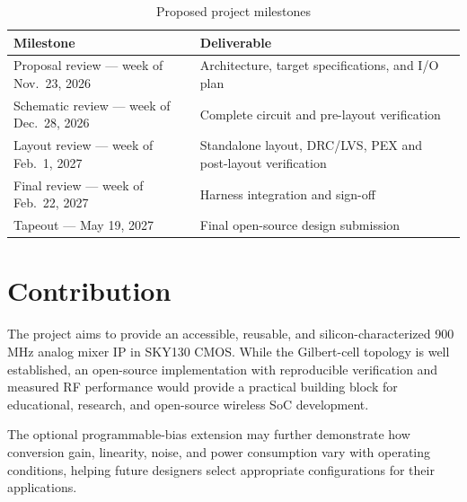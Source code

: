 \documentclass[11pt,letterpaper]{article}
\begin{document}
\begin{table}[htbp]
\centering
\caption{Proposed project milestones}
\label{tab:milestones}
\begin{tabularx}{\textwidth}{@{}p{}Y@{}}
\toprule
\textbf{Milestone} & \textbf{Deliverable} \\
\midrule

Proposal review --- week of Nov.\ 23, 2026 &
Architecture, target specifications, and I/O plan \\

Schematic review --- week of Dec.\ 28, 2026 &
Complete circuit and pre-layout verification \\

Layout review --- week of Feb.\ 1, 2027 &
Standalone layout, DRC/LVS, PEX and post-layout
verification \\

Final review --- week of Feb.\ 22, 2027 &
Harness integration and sign-off \\

Tapeout --- May 19, 2027 &
Final open-source design submission \\

\bottomrule
\end{tabularx}
\end{table}

\section{Contribution}

The project aims to provide an accessible, reusable, and silicon-characterized 900 MHz analog mixer IP in SKY130 CMOS.
While the Gilbert-cell topology is well established, an open-source implementation with reproducible verification and measured RF performance would provide a practical building block for educational, research, and open-source wireless SoC development.

The optional programmable-bias extension may further demonstrate how conversion gain, linearity, noise, and power consumption vary with operating conditions, helping future designers select appropriate configurations for their applications.



\end{document}
